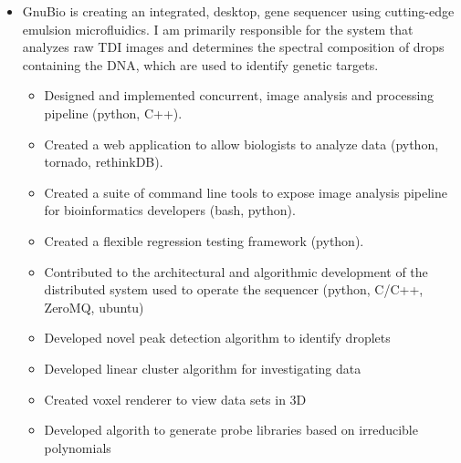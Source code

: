 \documentclass[11pt,a4paper,sans]{moderncv}        %
\begin{document}
\vspace{6pt}

\begin{itemize}

  \item{}

    GnuBio is creating an integrated, desktop, gene sequencer using cutting-edge
    emulsion microfluidics. I am primarily responsible for the system that
    analyzes raw TDI images and determines the spectral composition of drops
    containing the DNA, which are used to identify genetic targets.

    \begin{itemize}
      \item{Designed and implemented concurrent, image analysis and processing pipeline (python, C++).}
      \item{Created a web application to allow biologists to analyze data (python, tornado, rethinkDB).}
      \item{Created a suite of command line tools to expose image analysis pipeline for bioinformatics developers (bash, python).}
      \item{Created a flexible regression testing framework (python).}
      \item{Contributed to the architectural and algorithmic development of the distributed system used to operate the sequencer (python, C/C++, ZeroMQ, ubuntu)}
      \item{Developed novel peak detection algorithm to identify droplets}
      \item{Developed linear cluster algorithm for investigating data}
      \item{Created voxel renderer to view data sets in 3D}
      \item{Developed algorith to generate probe libraries based on irreducible polynomials}
    \end{itemize}


\end{itemize}


\vspace{6pt}
\end{document}
